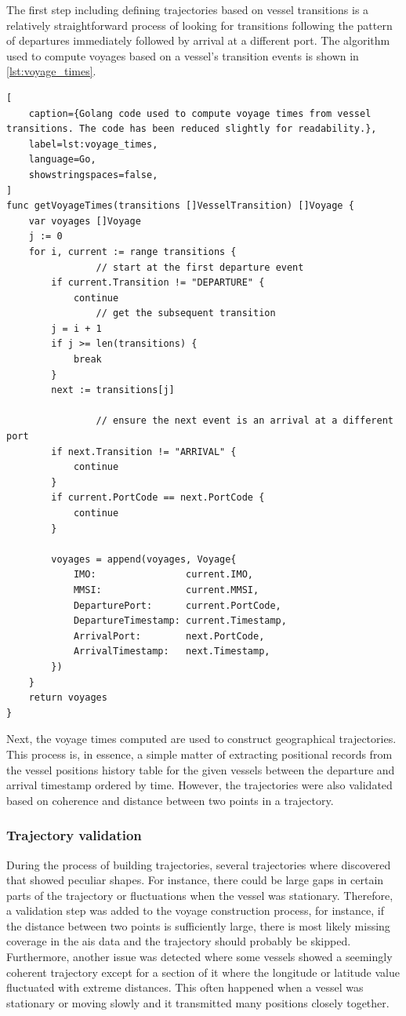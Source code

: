 The first step including defining trajectories based on vessel transitions is a relatively straightforward process of looking for transitions following the pattern of departures immediately followed by arrival at a different port. The algorithm used to compute voyages based on a vessel's transition events is shown in \cref{lst:voyage_times}.

\begin{lstlisting}[
    caption={Golang code used to compute voyage times from vessel transitions. The code has been reduced slightly for readability.},
    label=lst:voyage_times,
    language=Go,
    showstringspaces=false,
]
func getVoyageTimes(transitions []VesselTransition) []Voyage {
	var voyages []Voyage
	j := 0
	for i, current := range transitions {
                // start at the first departure event
		if current.Transition != "DEPARTURE" {
			continue
                // get the subsequent transition
		j = i + 1
		if j >= len(transitions) {
			break
		}
		next := transitions[j]

                // ensure the next event is an arrival at a different port
		if next.Transition != "ARRIVAL" {
			continue
		}
		if current.PortCode == next.PortCode {
			continue
		}

		voyages = append(voyages, Voyage{
			IMO:                current.IMO,
			MMSI:               current.MMSI,
			DeparturePort:      current.PortCode,
			DepartureTimestamp: current.Timestamp,
			ArrivalPort:        next.PortCode,
			ArrivalTimestamp:   next.Timestamp,
		})
	}
	return voyages
}
\end{lstlisting}

Next, the voyage times computed are used to construct geographical trajectories. This process is, in essence, a simple matter of extracting positional records from the vessel positions history table for the given vessels between the departure and arrival timestamp ordered by time. However, the trajectories were also validated based on coherence and distance between two points in a trajectory.

\subsubsection{Trajectory validation}

During the process of building trajectories, several trajectories where discovered that showed peculiar shapes. For instance, there could be large gaps in certain parts of the trajectory or fluctuations when the vessel was stationary. Therefore, a validation step was added to the voyage construction process, for instance, if the distance between two points is sufficiently large, there is most likely missing coverage in the \acrshort{ais} data and the trajectory should probably be skipped. Furthermore, another issue was detected where some vessels showed a seemingly coherent trajectory except for a section of it where the longitude or latitude value fluctuated with extreme distances. This often happened when a vessel was stationary or moving slowly and it transmitted many positions closely together.

